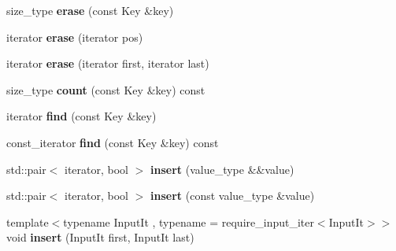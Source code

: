 \begin{DoxyCompactItemize}
\mbox{\label{structnlohmann_1_1ordered__map_a583c8976bbf0c137ff8e2439878f3058}} 
size\+\_\+type {\bfseries erase} (const Key \&key)
\item 
\mbox{\label{structnlohmann_1_1ordered__map_a26053569acb0a858d87482b2fa3d5dc5}} 
iterator {\bfseries erase} (iterator pos)
\item 
\mbox{\label{structnlohmann_1_1ordered__map_a6f766b4df72c42ac14d55603c85f9e36}} 
iterator {\bfseries erase} (iterator first, iterator last)
\item 
\mbox{\label{structnlohmann_1_1ordered__map_aee2c188dcc802d6b28910f707a5e637b}} 
size\+\_\+type {\bfseries count} (const Key \&key) const
\item 
\mbox{\label{structnlohmann_1_1ordered__map_a2486527ac56e07d58946ae9a93a46bc8}} 
iterator {\bfseries find} (const Key \&key)
\item 
\mbox{\label{structnlohmann_1_1ordered__map_a41e6e34fa8a90b96cbe5c71fec10d2ee}} 
const\+\_\+iterator {\bfseries find} (const Key \&key) const
\item 
\mbox{\label{structnlohmann_1_1ordered__map_a48eceff729b80f3f4a023b737efccc5b}} 
std\+::pair$<$ iterator, bool $>$ {\bfseries insert} (value\+\_\+type \&\&value)
\item 
\mbox{\label{structnlohmann_1_1ordered__map_a0241433138719e477a3cbb0c4cf0a243}} 
std\+::pair$<$ iterator, bool $>$ {\bfseries insert} (const value\+\_\+type \&value)
\item 
\mbox{\label{structnlohmann_1_1ordered__map_a2c8509f72bc33307661f1a0ed5763f9e}} 
{\footnotesize template$<$typename Input\+It , typename  = require\+\_\+input\+\_\+iter$<$\+Input\+It$>$$>$ }\\void {\bfseries insert} (Input\+It first, Input\+It last)
\end{DoxyCompactItemize}


